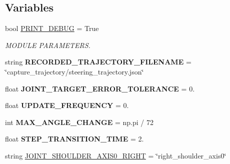 \subsection*{Variables}
\begin{DoxyCompactItemize}
\item 
\mbox{\label{namespacedoxytest_aac4f5bee70e8a477342a1119719c5a30}} 
bool \mbox{\hyperlink{namespacedoxytest_aac4f5bee70e8a477342a1119719c5a30}{P\+R\+I\+N\+T\+\_\+\+D\+E\+B\+UG}} = True
\begin{DoxyCompactList}\small\item\em M\+O\+D\+U\+LE P\+A\+R\+A\+M\+E\+T\+E\+RS. \end{DoxyCompactList}\item 
\mbox{\label{namespacedoxytest_a4811e854b4a5eb1f478320c5fb47138d}} 
string {\bfseries R\+E\+C\+O\+R\+D\+E\+D\+\_\+\+T\+R\+A\+J\+E\+C\+T\+O\+R\+Y\+\_\+\+F\+I\+L\+E\+N\+A\+ME} = \char`\"{}capture\+\_\+trajectory/steering\+\_\+trajectory.\+json\char`\"{}
\item 
\mbox{\label{namespacedoxytest_adcb3190b0e98c87e139c82668b1d4503}} 
float {\bfseries J\+O\+I\+N\+T\+\_\+\+T\+A\+R\+G\+E\+T\+\_\+\+E\+R\+R\+O\+R\+\_\+\+T\+O\+L\+E\+R\+A\+N\+CE} = 0.
\item 
\mbox{\label{namespacedoxytest_acbb3e9ee0741e1093ec1ca2d52a4907c}} 
float {\bfseries U\+P\+D\+A\+T\+E\+\_\+\+F\+R\+E\+Q\+U\+E\+N\+CY} = 0.
\item 
\mbox{\label{namespacedoxytest_abdddde44a25b3164f3b61b06a159f642}} 
int {\bfseries M\+A\+X\+\_\+\+A\+N\+G\+L\+E\+\_\+\+C\+H\+A\+N\+GE} = np.\+pi / 72
\item 
\mbox{\label{namespacedoxytest_a21195725b6a96da4907e3940ae913813}} 
float {\bfseries S\+T\+E\+P\+\_\+\+T\+R\+A\+N\+S\+I\+T\+I\+O\+N\+\_\+\+T\+I\+ME} = 2.
\item 
\mbox{\label{namespacedoxytest_a4d26eb6f8f6f699ef767cc91ae179109}} 
string \mbox{\hyperlink{namespacedoxytest_a4d26eb6f8f6f699ef767cc91ae179109}{J\+O\+I\+N\+T\+\_\+\+S\+H\+O\+U\+L\+D\+E\+R\+\_\+\+A\+X\+I\+S0\+\_\+\+R\+I\+G\+HT}} = \char`\"{}right\+\_\+shoulder\+\_\+axis0\char`\"{}

\end{DoxyCompactItemize}
